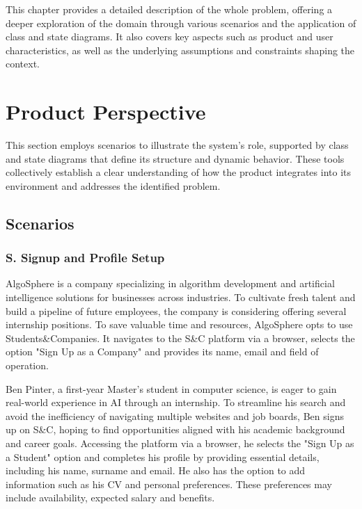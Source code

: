 This chapter provides a detailed description of the whole problem, offering a deeper exploration of the domain through various scenarios and the application of class and state diagrams.
It also covers key aspects such as product and user characteristics, as well as the underlying assumptions and constraints shaping the context.

\section{Product Perspective}
This section employs scenarios to illustrate the system's role, supported by class and state diagrams that define its structure and dynamic behavior.
These tools collectively establish a clear understanding of how the product integrates into its environment and addresses the identified problem.

\subsection{Scenarios}
\setcounter{s}{1}
\newcommand{\sco}{\thes{}}

\subsubsection*{S\sco. Signup and Profile Setup}
AlgoSphere is a company specializing in algorithm development and artificial intelligence solutions for businesses across industries.
To cultivate fresh talent and build a pipeline of future employees, the company is considering offering several internship positions.
To save valuable time and resources, AlgoSphere opts to use Students\&Companies.
It navigates to the S\&C platform via a browser, selects the option "Sign Up as a Company"
and provides its name, email and field of operation.

Ben Pinter, a first-year Master's student in computer science, is eager to gain real-world experience in AI through an internship.
To streamline his search and avoid the inefficiency of navigating multiple websites and job boards, Ben signs up on S\&C, hoping to find opportunities aligned with his academic background and career goals.
Accessing the platform via a browser, he selects the "Sign Up as a Student" option and completes his profile by providing essential details, including his name, surname and email.
He also has the option to add information such as his CV and personal preferences.
These preferences may include availability, expected salary and benefits.

